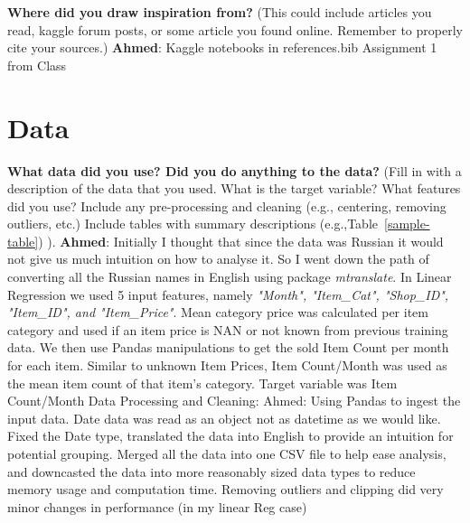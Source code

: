 \documentclass{article}
\begin{document}
\textbf{Where did you draw inspiration from?} 
(This could include articles you read, kaggle forum posts, or some article you found online. Remember to properly cite your sources.)\newline
\textbf{Ahmed}:\newline
Kaggle notebooks in references.bib\newline
Assignment 1 from Class


\section{Data}
\textbf{What data did you use? Did you do anything to the data?}
(Fill in with a description of the data that you used. What is the target variable? What features did you use? Include any pre-processing and cleaning (e.g., centering, removing outliers, etc.) Include tables with summary descriptions (e.g.,Table~\ref{sample-table}) ).
\newline\newline
\textbf{Ahmed}:\newline
Initially I thought that since the data was Russian it would not give us much intuition on how to analyse it. So I went down the path of converting all the Russian names in English using package \textit{mtranslate}. \newline
In Linear Regression we used 5 input features, namely \textit{"Month", "Item\_Cat", "Shop\_ID", "Item\_ID", and "Item\_Price"}. Mean category price was calculated per item category and used if an item price is NAN or not known from previous training data. We then use Pandas manipulations to get the sold Item Count per month for each item. Similar to unknown Item Prices, Item Count/Month was used as the mean item count of that item's category. Target variable was Item Count/Month  \newline\newline
Data Processing and Cleaning:\newline
Ahmed:\newline
Using Pandas to ingest the input data.\newline
Date data was read as an object not as datetime as we would like. \newline
Fixed the Date type, translated the data into English to provide an intuition for potential grouping.\newline
Merged all the data into one CSV file to help ease analysis, and downcasted the data into more reasonably sized data types to reduce memory usage and computation time.\newline
Removing outliers and clipping did very minor changes in performance (in my linear Reg case)\newline
\end{document}
